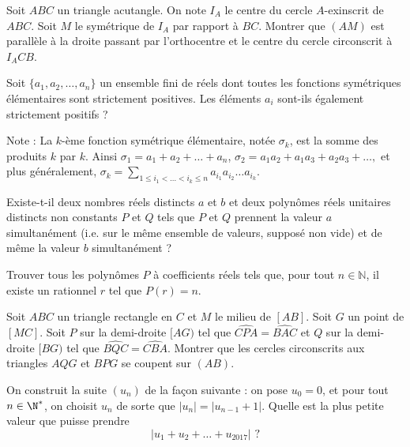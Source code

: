 \begin{exo}{}
Soit $ABC$ un triangle acutangle. On note $I_A$ le centre du cercle $A$-exinscrit de $ABC$. Soit $M$ le symétrique de $I_A$ par rapport à $BC$. Montrer que $(AM)$ est parallèle à la droite passant par l'orthocentre et le centre du cercle circonscrit à $I_ACB$.

\end{exo}



\begin{exo}{}
Soit $\{a_1, a_2, \ldots, a_n\}$ un ensemble fini de réels dont toutes les fonctions symétriques élémentaires sont strictement positives. Les éléments $a_i$ sont-ils également strictement positifs ?

Note : La $k$-ème fonction symétrique élémentaire, notée $\sigma_k$, est la somme des produits $k$ par $k$. Ainsi
$\sigma_1 = a_1 + a_2 + \ldots+a_n$, $
\sigma_2 = a_1a_2 + a_1a_3 + a_2a_3 + \ldots ,$ et plus généralement, $\sigma_k = \sum_{1\leq i_1 < \ldots < i_k \leq n} a_{i_1}a_{i_2}\ldots a_{i_k}$.
\end{exo}

\begin{exo}{}
Existe-t-il deux nombres réels distincts $a$ et $b$ et deux polynômes réels unitaires distincts non constants $P$ et $Q$ tels que $P$ et $Q$ prennent la valeur $a$ simultanément (i.e. sur le même ensemble de valeurs, supposé non vide) et de même la valeur $b$ simultanément ?
\end{exo}


\begin{exo}{}
Trouver tous les polynômes $P$ à coefficients réels tels que, pour tout $n \in \mathbb{N}$, il existe un rationnel $r$ tel que $P(r)=n$.
\end{exo}


\begin{exo}{}
Soit $ABC$ un triangle rectangle en $C$ et $M$ le milieu de $[AB]$. Soit $G$ un point de $[MC]$. Soit $P$ sur la demi-droite $[AG)$ tel que $\widehat{CPA}=\widehat{BAC}$ et $Q$ sur la demi-droite $[BG)$ tel que $\widehat{BQC}=\widehat{CBA}$. Montrer que les cercles circonscrits aux triangles $AQG$ et $BPG$ se coupent sur $(AB)$.
\end{exo}

\begin{exo}{}
On construit la suite $(u_n)$ de la façon suivante : on pose $u_0=0$, et pour tout $n\in \N^*$, on choisit $u_n$ de sorte que $\vert u_n\vert = \vert u_{n-1}+1\vert$. Quelle est la plus petite valeur que puisse prendre
$$\vert u_1+u_2+\ldots+u_{2017}\vert \, \, ?$$
\end{exo}


